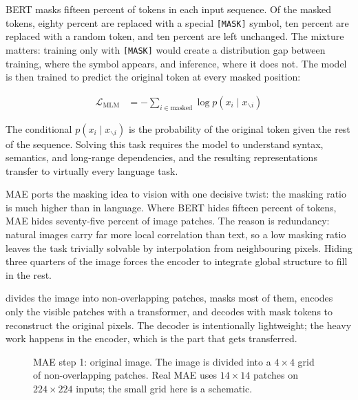 \cite{Devlin2019BERT}
BERT masks fifteen percent of tokens in each input sequence.
Of the masked tokens, eighty percent are replaced with a special \texttt{[MASK]} symbol, ten percent are replaced with a random token, and ten percent are left unchanged.
The mixture matters: training only with \texttt{[MASK]} would create a distribution gap between training, where the symbol appears, and inference, where it does not.
The model is then trained to predict the original token at every masked position:

\begin{align}
    \mathcal{L}_{\text{MLM}} &= -\sum_{i \in \text{masked}} \log p(x_i \mid x_{\backslash i})
    \label{eq:mlm}
\end{align}

The conditional $p(x_i \mid x_{\backslash i})$ is the probability of the original token given the rest of the sequence.
Solving this task requires the model to understand syntax, semantics, and long-range dependencies, and the resulting representations transfer to virtually every language task.

\vspace{1.5em}

\cite{He2022MAE}
MAE ports the masking idea to vision with one decisive twist: the masking ratio is much higher than in language.
Where BERT hides fifteen percent of tokens, MAE hides seventy-five percent of image patches.
The reason is redundancy: natural images carry far more local correlation than text, so a low masking ratio leaves the task trivially solvable by interpolation from neighbouring pixels.
Hiding three quarters of the image forces the encoder to integrate global structure to fill in the rest.

 divides the image into non-overlapping patches, masks most of them, encodes only the visible patches with a transformer, and decodes with mask tokens to reconstruct the original pixels.
The decoder is intentionally lightweight; the heavy work happens in the encoder, which is the part that gets transferred.

\begin{figure}
\centering
{}
\caption{MAE step 1: original image. The image is divided into a $4 \times 4$ grid of non-overlapping patches. Real MAE uses $14 \times 14$ patches on $224 \times 224$ inputs; the small grid here is a schematic.}
\label{fig:mae_original}
\end{figure}


